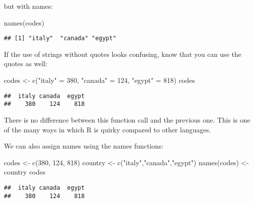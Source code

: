 \documentclass[
]{article}
\newenvironment{Shaded}{\begin{snugshade}}{\end{snugshade}}
\newcommand{\DecValTok}[1]{\textcolor[rgb]{0.00,0.00,0.81}{#1}}
\newcommand{\FunctionTok}[1]{\textcolor[rgb]{0.00,0.00,0.00}{#1}}
\newcommand{\NormalTok}[1]{#1}
\newcommand{\OtherTok}[1]{\textcolor[rgb]{0.56,0.35,0.01}{#1}}
\newcommand{\StringTok}[1]{\textcolor[rgb]{0.31,0.60,0.02}{#1}}
\begin{document}
but with names:

\begin{Shaded}
\begin{Highlighting}[]
\FunctionTok{names}\NormalTok{(codes)}
\end{Highlighting}
\end{Shaded}

\begin{verbatim}
## [1] "italy"  "canada" "egypt"
\end{verbatim}

If the use of strings without quotes looks confusing, know that you can
use the quotes as well:

\begin{Shaded}
\begin{Highlighting}[]
\NormalTok{codes }\OtherTok{\textless{}{-}} \FunctionTok{c}\NormalTok{(}\StringTok{"italy"} \OtherTok{=} \DecValTok{380}\NormalTok{, }\StringTok{"canada"} \OtherTok{=} \DecValTok{124}\NormalTok{, }\StringTok{"egypt"} \OtherTok{=} \DecValTok{818}\NormalTok{)}
\NormalTok{codes}
\end{Highlighting}
\end{Shaded}

\begin{verbatim}
##  italy canada  egypt 
##    380    124    818
\end{verbatim}

There is no difference between this function call and the previous one.
This is one of the many ways in which R is quirky compared to other
languages.

We can also assign names using the names functions:

\begin{Shaded}
\begin{Highlighting}[]
\NormalTok{codes }\OtherTok{\textless{}{-}} \FunctionTok{c}\NormalTok{(}\DecValTok{380}\NormalTok{, }\DecValTok{124}\NormalTok{, }\DecValTok{818}\NormalTok{)}
\NormalTok{country }\OtherTok{\textless{}{-}} \FunctionTok{c}\NormalTok{(}\StringTok{"italy"}\NormalTok{,}\StringTok{"canada"}\NormalTok{,}\StringTok{"egypt"}\NormalTok{)}
\FunctionTok{names}\NormalTok{(codes) }\OtherTok{\textless{}{-}}\NormalTok{ country}
\NormalTok{codes}
\end{Highlighting}
\end{Shaded}

\begin{verbatim}
##  italy canada  egypt 
##    380    124    818
\end{verbatim}
\end{document}
